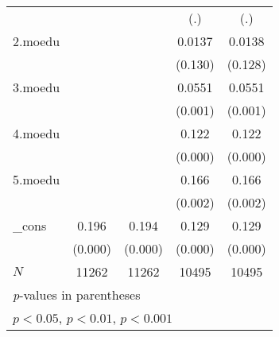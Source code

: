 {\begin{tabular}{l*{4}{c}}
            &                     &                     &         (.)         &         (.)         \\
[1em]
2.moedu     &                     &                     &      0.0137         &      0.0138         \\
            &                     &                     &     (0.130)         &     (0.128)         \\
[1em]
3.moedu     &                     &                     &      0.0551\sym{***}&      0.0551\sym{***}\\
            &                     &                     &     (0.001)         &     (0.001)         \\
[1em]
4.moedu     &                     &                     &       0.122\sym{***}&       0.122\sym{***}\\
            &                     &                     &     (0.000)         &     (0.000)         \\
[1em]
5.moedu     &                     &                     &       0.166\sym{**} &       0.166\sym{**} \\
            &                     &                     &     (0.002)         &     (0.002)         \\
[1em]
\_cons      &       0.196\sym{***}&       0.194\sym{***}&       0.129\sym{***}&       0.129\sym{***}\\
            &     (0.000)         &     (0.000)         &     (0.000)         &     (0.000)         \\
\hline
\(N\)       &       11262         &       11262         &       10495         &       10495         \\
\hline\hline
\multicolumn{5}{l}{\footnotesize \textit{p}-values in parentheses}\\
\multicolumn{5}{l}{\footnotesize \sym{*} \(p<0.05\), \sym{**} \(p<0.01\), \sym{***} \(p<0.001\)}\\
\end{tabular}
}
